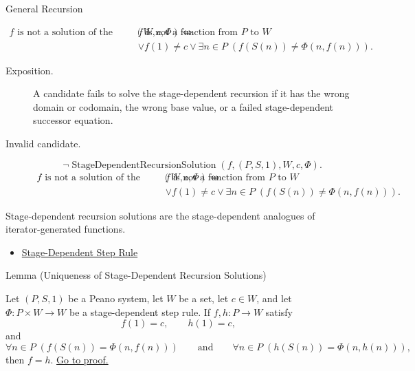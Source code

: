\begin{topicbox}{General Recursion}
\begin{remark*}
\[
\begin{aligned}
f \text{ is not a solution of the stage-dependent recursion determined by } (W,c,\Phi)
\Longleftrightarrow\;&
f \text{ is not a function from } P \text{ to } W\\
&\lor f(1)\neq c
\lor \exists n\in P\;(f(S(n))\neq \Phi(n,f(n))).
\end{aligned}
\]
\end{remark*}

\begin{remark*}
\begin{description}
  \item[Exposition.]
  A candidate fails to solve the stage-dependent recursion if it has the wrong
  domain or codomain, the wrong base value, or a failed stage-dependent
  successor equation.
  \item[Invalid candidate.]
  \[
  \neg\operatorname{StageDependentRecursionSolution}(f,(P,S,1),W,c,\Phi).
  \]
  \[
  \begin{aligned}
  f \text{ is not a solution of the stage-dependent recursion determined by } (W,c,\Phi)
  \Longleftrightarrow\;&
  f \text{ is not a function from } P \text{ to } W\\
  &\lor f(1)\neq c
  \lor \exists n\in P\;(f(S(n))\neq \Phi(n,f(n))).
  \end{aligned}
  \]
\end{description}
\end{remark*}

\begin{remark*}[Interpretation]
Stage-dependent recursion solutions are the stage-dependent analogues of
iterator-generated functions.
\end{remark*}

\begin{dependencies}
\begin{itemize}
  \item \hyperref[def:stage-dependent-step-rule]{Stage-Dependent Step Rule}
\end{itemize}
\end{dependencies}

\begin{lemmabox}{Lemma (Uniqueness of Stage-Dependent Recursion Solutions)}
\begin{lemma}
\label{lem:uniqueness-of-general-recursive-functions}
Let $(P,S,1)$ be a Peano system, let $W$ be a set, let $c\in W$, and let
$\Phi\colon P\times W\to W$ be a stage-dependent step rule. If
$f,h\colon P\to W$ satisfy
\[
f(1)=c,\qquad h(1)=c,
\]
and
\[
\forall n\in P\;(f(S(n))=\Phi(n,f(n)))
\qquad\text{and}\qquad
\forall n\in P\;(h(S(n))=\Phi(n,h(n))),
\]
then $f=h$.
\hyperref[prf:uniqueness-of-general-recursive-functions]{Go to proof.}
\end{lemma}
\end{lemmabox}


\end{topicbox}
